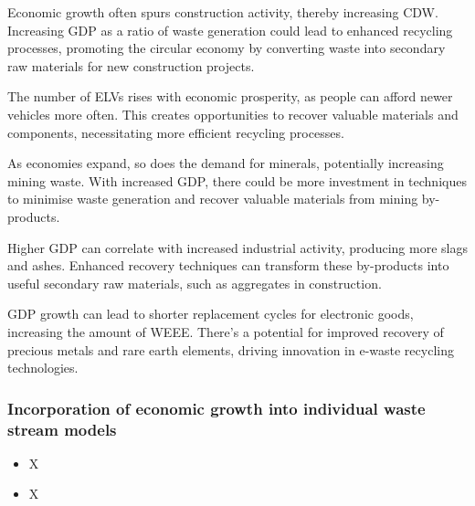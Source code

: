 \wasteSubsubsubsecCDW

Economic growth often spurs construction activity, thereby increasing CDW. Increasing GDP as a ratio of waste generation could lead to enhanced recycling processes, promoting the circular economy by converting waste into secondary raw materials for new construction projects.

\wasteSubsubsubsecELV

The number of ELVs rises with economic prosperity, as people can afford newer vehicles more often. This creates opportunities to recover valuable materials and components, necessitating more efficient recycling processes.

\wasteSubsubsubsecMIN

As economies expand, so does the demand for minerals, potentially increasing mining waste. With increased GDP, there could be more investment in techniques to minimise waste generation and recover valuable materials from mining by-products.

\wasteSubsubsubsecSLASH

Higher GDP can correlate with increased industrial activity, producing more slags and ashes. Enhanced recovery techniques can transform these by-products into useful secondary raw materials, such as aggregates in construction.

\wasteSubsubsubsecWEEE

GDP growth can lead to shorter replacement cycles for electronic goods, increasing the amount of WEEE. There's a potential for improved recovery of precious metals and rare earth elements, driving innovation in e-waste recycling technologies.

\clearpage

\subsubsection{Incorporation of economic growth into individual waste stream models}


\wasteSubsubsubsecBATT
\begin{itemize}
    \item X
\end{itemize}

\wasteSubsubsubsecCDW
\begin{itemize}
    \item X
\end{itemize}

